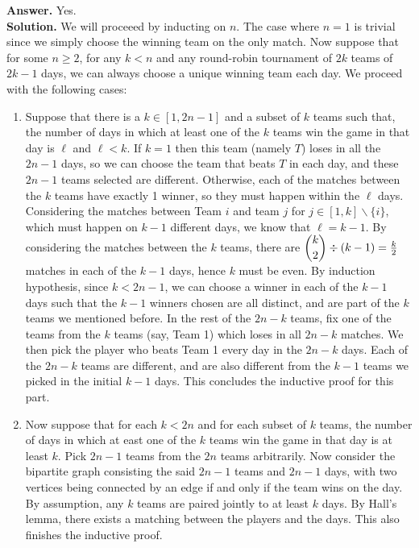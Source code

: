 \documentclass[11pt,a4paper]{article}
\newcommand{\<}{\langle}
\renewcommand{\>}{\rangle}
\begin{document}
\begin{enumerate}
	\textbf{Answer.} Yes. \\
	\textbf{Solution.} We will proceeed by inducting on $n$. The case where $n=1$ is trivial since we simply choose the winning team on the only match. Now suppose that for some $n\ge 2$, for any $k<n$ and any round-robin tournament of $2k$ teams of $2k-1$ days, we can always choose a unique winning team each day. We proceed with the following cases: 
	\begin{enumerate}
		\item Suppose that there is a $k\in [1, 2n-1]$ and a subset of $k$ teams such that, the number of days in which at least one of the $k$ teams win the game in that day is $\ell$ and $\ell < k$. If $k=1$ then this team (namely $T$) loses in all the $2n-1$ days, so we can choose the team that beats $T$ in each day, and these $2n-1$ teams selected are different. Otherwise, each of the matches between the $k$ teams have exactly 1 winner, so they must happen within the $\ell$ days. Considering the matches between Team $i$ and team $j$ for $j\in [1, k]\backslash \{i\}$, which must happen on $k-1$ different days, we know that $\ell = k-1$. By considering the matches between the $k$ teams, there are $\dbinom{k}{2}\div (k-1)=\frac{k}{2}$ matches in each of the $k-1$ days, hence $k$ must be even. By induction hypothesis, since $k<2n-1$, we can choose a winner in each of the $k-1$ days such that the $k-1$ winners chosen are all distinct, and are part of the $k$ teams we mentioned before. In the rest of the $2n-k$ teams, fix one of the teams from the $k$ teams (say, Team 1) which loses in all $2n-k$ matches. We then pick the player who beats Team 1 every day in the $2n-k$ days. Each of the $2n-k$ teams are different, and are also different from the $k-1$ teams we picked in the initial $k-1$ days. This concludes the inductive proof for this part. 
		
		\item Now suppose that for each $k<2n$ and for each subset of $k$ teams, the number of days in which at east one of the $k$ teams win the game in that day is at least $k$. Pick $2n-1$ teams from the $2n$ teams arbitrarily. Now consider the bipartite graph consisting the said $2n-1$ teams and $2n-1$ days, with two vertices being connected by an edge if and only if the team wins on the day. By assumption, any $k$ teams are paired jointly to at least $k$ days. By Hall's lemma, there exists a matching between the players and the days. This also finishes the inductive proof. 
	\end{enumerate}


\end{enumerate}
\end{document}
